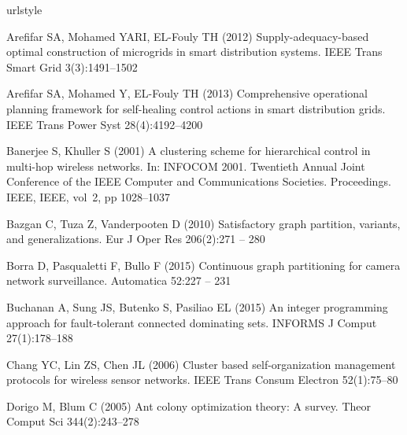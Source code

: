 \begin{thebibliography}{38}
\providecommand{\natexlab}[1]{#1}
\providecommand{\url}[1]{{#1}}
\providecommand{\urlprefix}{URL }
\expandafter\ifx\csname urlstyle\endcsname\relax
  \providecommand{\doi}[1]{DOI~\discretionary{}{}{}#1}\else
  \providecommand{\doi}{DOI~\discretionary{}{}{}\begingroup
  \urlstyle{rm}\Url}\fi
\providecommand{\eprint}[2][]{\url{#2}}

Arefifar SA, Mohamed YARI, EL-Fouly TH (2012) Supply-adequacy-based optimal
  construction of microgrids in smart distribution systems. IEEE Trans Smart
  Grid 3(3):1491--1502

Arefifar SA, Mohamed Y, EL-Fouly TH (2013) Comprehensive operational planning
  framework for self-healing control actions in smart distribution grids. IEEE
  Trans Power Syst 28(4):4192--4200

Banerjee S, Khuller S (2001) A clustering scheme for hierarchical control in
  multi-hop wireless networks. In: INFOCOM 2001. Twentieth Annual Joint
  Conference of the IEEE Computer and Communications Societies. Proceedings.
  IEEE, IEEE, vol~2, pp 1028--1037

Bazgan C, Tuza Z, Vanderpooten D (2010) Satisfactory graph partition, variants,
  and generalizations. Eur J Oper Res 206(2):271 -- 280

Borra D, Pasqualetti F, Bullo F (2015) Continuous graph partitioning for camera
  network surveillance. Automatica 52:227 -- 231

Buchanan A, Sung JS, Butenko S, Pasiliao EL (2015) An integer programming
  approach for fault-tolerant connected dominating sets. INFORMS J Comput
  27(1):178--188

Chang YC, Lin ZS, Chen JL (2006) Cluster based self-organization management
  protocols for wireless sensor networks. IEEE Trans Consum Electron
  52(1):75--80

Dorigo M, Blum C (2005) Ant colony optimization theory: A survey. Theor Comput
  Sci 344(2):243--278


\end{thebibliography}

